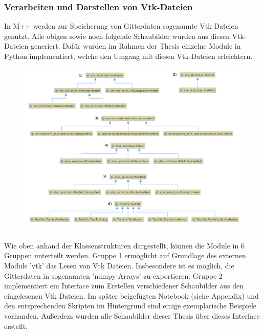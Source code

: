 \subsubsection{Verarbeiten und Darstellen von Vtk-Dateien}
In M++ werden zur Speicherung von Gitterdaten sogenannte Vtk-Dateien genutzt. Alle obigen sowie noch folgende Schaubilder wurden aus diesen Vtk-Dateien generiert. Dafür wurden im Rahmen der Thesis einzelne Module in Python implementiert, welche den Umgang mit diesen Vtk-Dateien erleichtern. 
\begin{figure}[H]
	\centering
	\includegraphics[width=\textwidth]{plots/umlklassen2.png} 
\end{figure}
Wie oben anhand der Klassenstrukturen dargestellt, können die Module in 6 Gruppen unterteilt werden. Gruppe 1 ermöglicht auf Grundlage des externen Moduls 'vtk' \cite{sitevtk} das Lesen von Vtk Dateien. Insbesondere ist es möglich, die Gitterdaten in sogenannten 'numpy-Arrays' zu exportieren. 
Gruppe 2 implementiert ein Interface zum Erstellen verschiedener Schaubilder aus den eingelesenen Vtk Dateien. Im später beigefügten Notebook (siehe Appendix) und den entsprechenden Skripten im Hintergrund sind einige exemplarische Beispiele vorhanden. Außerdem wurden alle Schaubilder dieser Thesis über dieses Interface erstellt.

